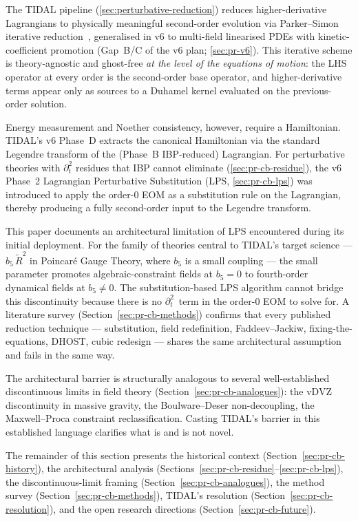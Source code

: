 The TIDAL pipeline (\cref{sec:perturbative-reduction}) reduces higher-derivative
Lagrangians to physically meaningful second-order evolution via Parker--Simon
iterative reduction~\cite{ParkerSimon1993}, generalised in v6 to multi-field
linearised PDEs with kinetic-coefficient promotion (Gap~B/C of the v6 plan;
\cref{sec:pr-v6}).  This iterative scheme is theory-agnostic and ghost-free
\emph{at the level of the equations of motion}: the LHS operator at every
order is the second-order base operator, and higher-derivative terms appear
only as sources to a Duhamel kernel evaluated on the previous-order solution.

Energy measurement and Noether consistency, however, require a Hamiltonian.
TIDAL's v6 Phase~D extracts the canonical Hamiltonian via the standard
Legendre transform of the (Phase~B IBP-reduced) Lagrangian.  For perturbative
theories with $\partial_t^2$ residues that IBP cannot eliminate
(\cref{sec:pr-cb-residue}), the v6 Phase~2 Lagrangian Perturbative Substitution
(LPS, \cref{sec:pr-cb-lps}) was introduced to apply the order-0 EOM as a
substitution rule on the Lagrangian, thereby producing a fully second-order
input to the Legendre transform.

This paper documents an architectural limitation of LPS encountered during
its initial deployment.  For the family of theories central to TIDAL's
target science --- $b_5\,\tilde{R}^2$ in Poincar\'e Gauge Theory, where
$b_5$ is a small coupling --- the small parameter promotes algebraic-constraint
fields at $b_5 = 0$ to fourth-order dynamical fields at $b_5 \ne 0$.  The
substitution-based LPS algorithm cannot bridge this discontinuity because
there is no $\partial_t^2$~term in the order-0 EOM to solve for.  A
literature survey (Section~\ref{sec:pr-cb-methods}) confirms that every
published reduction technique --- substitution, field redefinition,
Faddeev--Jackiw, fixing-the-equations, DHOST, cubic redesign --- shares the
same architectural assumption and fails in the same way.

The architectural barrier is structurally analogous to several
well-established discontinuous limits in field theory
(Section~\ref{sec:pr-cb-analogues}): the vDVZ discontinuity in massive
gravity, the Boulware--Deser non-decoupling, the Maxwell--Proca constraint
reclassification.  Casting TIDAL's barrier in this established language
clarifies what is and is not novel.

The remainder of this section presents the historical context
(Section~\ref{sec:pr-cb-history}), the architectural analysis
(Sections~\ref{sec:pr-cb-residue}--\ref{sec:pr-cb-lps}), the discontinuous-limit
framing (Section~\ref{sec:pr-cb-analogues}), the method survey
(Section~\ref{sec:pr-cb-methods}), TIDAL's resolution
(Section~\ref{sec:pr-cb-resolution}), and the open research directions
(Section~\ref{sec:pr-cb-future}).

